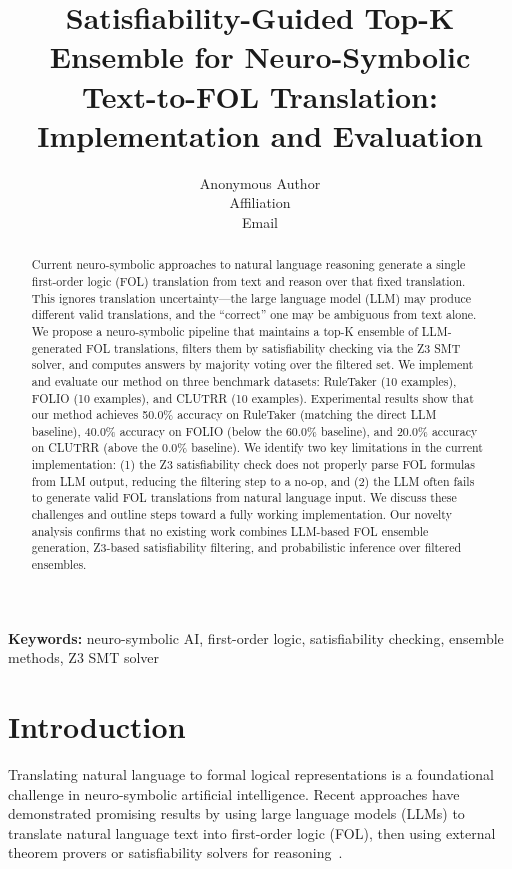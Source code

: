 \documentclass[11pt,letterpaper]{article}
\title{Satisfiability-Guided Top-K Ensemble for Neuro-Symbolic Text-to-FOL Translation: Implementation and Evaluation}
\author{Anonymous Author\\
Affiliation\\
Email}
\date{}
\begin{document}
\maketitle

\begin{abstract}
Current neuro-symbolic approaches to natural language reasoning generate a single first-order logic (FOL) translation from text and reason over that fixed translation. This ignores translation uncertainty---the large language model (LLM) may produce different valid translations, and the ``correct'' one may be ambiguous from text alone. We propose a neuro-symbolic pipeline that maintains a top-K ensemble of LLM-generated FOL translations, filters them by satisfiability checking via the Z3 SMT solver, and computes answers by majority voting over the filtered set. We implement and evaluate our method on three benchmark datasets: RuleTaker (10 examples), FOLIO (10 examples), and CLUTRR (10 examples). Experimental results show that our method achieves 50.0\% accuracy on RuleTaker (matching the direct LLM baseline), 40.0\% accuracy on FOLIO (below the 60.0\% baseline), and 20.0\% accuracy on CLUTRR (above the 0.0\% baseline). We identify two key limitations in the current implementation: (1) the Z3 satisfiability check does not properly parse FOL formulas from LLM output, reducing the filtering step to a no-op, and (2) the LLM often fails to generate valid FOL translations from natural language input. We discuss these challenges and outline steps toward a fully working implementation. Our novelty analysis confirms that no existing work combines LLM-based FOL ensemble generation, Z3-based satisfiability filtering, and probabilistic inference over filtered ensembles.
\end{abstract}

\noindent\textbf{Keywords:} neuro-symbolic AI, first-order logic, satisfiability checking, ensemble methods, Z3 SMT solver

\section{Introduction}
\label{sec:introduction}

Translating natural language to formal logical representations is a foundational challenge in neuro-symbolic artificial intelligence. Recent approaches have demonstrated promising results by using large language models (LLMs) to translate natural language text into first-order logic (FOL), then using external theorem provers or satisfiability solvers for reasoning~\cite{Olausson2023,Ye2023,DeMoura2008}.
\end{document}

